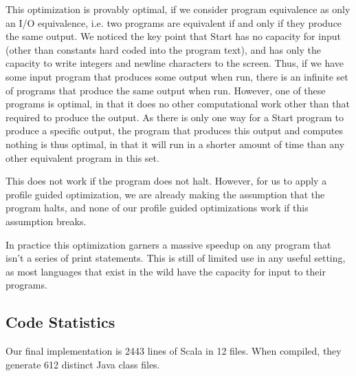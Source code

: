\documentclass[12pt,letterpaper]{article}
\begin{document}
This optimization is provably optimal, if we consider program
equivalence as only an I/O equivalence, i.e. two programs are
equivalent if and only if they produce the same output. We noticed the
key point that Start has no capacity for input (other than constants
hard coded into the program text), and has only the capacity to write
integers and newline characters to the screen. Thus, if we have some
input program that produces some output when run, there is an infinite
set of programs that produce the same output when run. However, one of
these programs is optimal, in that it does no other computational work
other than that required to produce the output. As there is only one
way for a Start program to produce a specific output, the program that
produces this output and computes nothing is thus optimal, in that it
will run in a shorter amount of time than any other equivalent program
in this set.

This does not work if the program does not halt. However, for us to
apply a profile guided optimization, we are already making the
assumption that the program halts, and none of our profile guided
optimizations work if this assumption breaks.

In practice this optimization garners a massive speedup on any program
that isn't a series of print statements. This is still of limited use
in any useful setting, as most languages that exist in the wild have
the capacity for input to their programs.

\subsection*{Code Statistics}

Our final implementation is 2443 lines of Scala in 12 files. When
compiled, they generate 612 distinct Java class files. 
\end{document}
